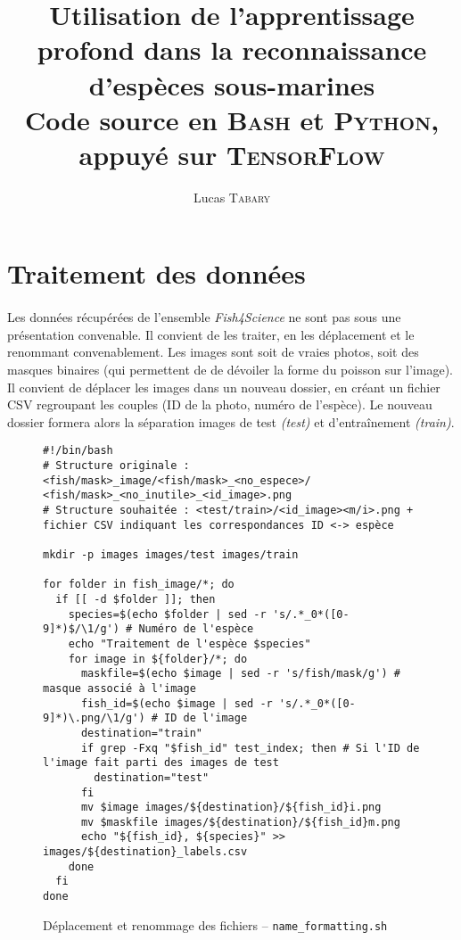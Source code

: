 \documentclass{article}
\title{Utilisation de l'apprentissage profond dans la reconnaissance d'espèces sous-marines \\[0.5em]
\large Code source en \textsc{Bash} et \textsc{Python}, appuyé sur \textsc{TensorFlow}}
\author{Lucas \textsc{Tabary}}
\date{}
\begin{document}
  \maketitle

  \section{Traitement des données}

  \paragraph{} Les données récupérées de l'ensemble \textit{Fish4Science} ne sont pas sous une présentation convenable. Il convient de les traiter, en les déplacement et le renommant convenablement. Les images sont soit de vraies photos, soit des masques binaires (qui permettent de de dévoiler la forme du poisson sur l'image). Il convient de déplacer les images dans un nouveau dossier, en créant un fichier CSV regroupant les couples (ID de la photo, numéro de l'espèce). Le nouveau dossier formera alors la séparation images de test \textit{(test)} et d'entraînement \textit{(train)}.

  \begin{figure}[h]
    \begin{lstlisting}[style=bash]
#!/bin/bash
# Structure originale : <fish/mask>_image/<fish/mask>_<no_espece>/ <fish/mask>_<no_inutile>_<id_image>.png
# Structure souhaitée : <test/train>/<id_image><m/i>.png + fichier CSV indiquant les correspondances ID <-> espèce

mkdir -p images images/test images/train

for folder in fish_image/*; do
  if [[ -d $folder ]]; then
    species=$(echo $folder | sed -r 's/.*_0*([0-9]*)$/\1/g') # Numéro de l'espèce
    echo "Traitement de l'espèce $species"
    for image in ${folder}/*; do
      maskfile=$(echo $image | sed -r 's/fish/mask/g') # masque associé à l'image
      fish_id=$(echo $image | sed -r 's/.*_0*([0-9]*)\.png/\1/g') # ID de l'image
      destination="train"
      if grep -Fxq "$fish_id" test_index; then # Si l'ID de l'image fait parti des images de test
        destination="test"
      fi
      mv $image images/${destination}/${fish_id}i.png
      mv $maskfile images/${destination}/${fish_id}m.png
      echo "${fish_id}, ${species}" >> images/${destination}_labels.csv
    done
  fi
done
    \end{lstlisting}
    \caption{Déplacement et renommage des fichiers -- \texttt{name\_formatting.sh}}
  \end{figure}
\end{document}
